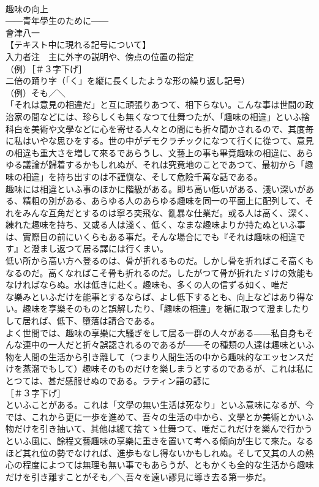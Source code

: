 \documentclass[8pt]{extreport}
\begin{document}
\begin{CJK}{UTF8}{min}
\\	趣味の向上
\\	――青年學生のために――
\\	會津八一
\\	【テキスト中に現れる記号について】
\\	入力者注　主に外字の説明や、傍点の位置の指定
\\	（例）［＃３字下げ］
\\	二倍の踊り字（「く」を縦に長くしたような形の繰り返し記号）
\\	（例）そも／＼
\\	「それは意見の相違だ」と互に頑張りあつて、相下らない。こんな事は世間の政治家の間などには、珍らしくも無くなつて仕舞つたが、「趣味の相違」といふ捨科白を美術や文學などに心を寄せる人々との間にも折々聞かされるので、其度毎に私はいやな思ひをする。世の中がデモクラチックになつて行くに從つて、意見の相違も重大さを増して來るであらうし、文藝上の事も畢竟趣味の相違に、あらゆる議論が歸着するかもしれぬが、それは究竟地のことであつて、最初から「趣味の相違」を持ち出すのは不謹愼な、そして危險千萬な話である。
\\	趣味には相違といふ事のほかに階級がある。即ち高い低いがある、淺い深いがある、精粗の別がある、あらゆる人のあらゆる趣味を同一の平面上に配列して、それをみんな互角だとするのは寧ろ突飛な、亂暴な仕業だ。或る人は高く、深く、練れた趣味を持ち、又或る人は淺く、低く、なまな趣味よりか持たぬといふ事は、實際目の前にいくらもある事だ。そんな場合にでも『それは趣味の相違です』と澄まし返つて居る譯には行くまい。
\\	低い所から高い方へ登るのは、骨が折れるものだ。しかし骨を折ればこそ高くもなるのだ。高くなればこそ骨も折れるのだ。したがつて骨が折れたゞけの效能もなければならぬ。水は低きに赴く。趣味も、多くの人の信ずる如く、唯だ 
\\	な樂みといふだけを能事とするならば、よし低下するとも、向上などはあり得ない。趣味を享樂そのものと誤解したり、「趣味の相違」を楯に取つて澄ましたりして居れば、低下、墮落は請合である。
\\	よく世間では、趣味の享樂に大騷ぎをして居る一群の人々がある――私自身もそんな連中の一人だと折々誤認されるのであるが――その種類の人達は趣味といふ物を人間の生活から引き離して（つまり人間生活の中から趣味的なエッセンスだけを蒸溜でもして）趣味そのものだけを樂しまうとするのであるが、これは私にとつては、甚だ感服せぬのである。ラティン語の諺に
\\	［＃３字下げ］
\\	といふことがある。これは「文學の無い生活は死なり」といふ意味になるが、今では、これから更に一歩を進めて、吾々の生活の中から、文學とか美術とかいふ物だけを引き抽いて、其他は總て捨てゝ仕舞つて、唯だこれだけを樂んで行かうといふ風に、餘程文藝趣味の享樂に重きを置いて考へる傾向が生じて來た。なるほど其れ位の勢でなければ、進歩もなし得ないかもしれぬ。そして又其の人の熱心の程度によつては無理も無い事でもあらうが、ともかくも全的な生活から趣味だけを引き離すことがそも／＼吾々を遠い謬見に導き去る第一歩だ。

\end{CJK}
\end{document}
